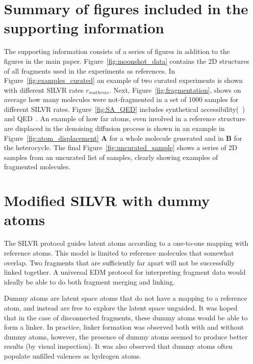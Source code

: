 \documentclass[journal=jacsat,manuscript=article]{achemso}
\begin{document}



\newpage 
\begin{suppinfo}

\section{Summary of figures included in the supporting information}
The supporting information consists of a series of figures in addition to the figures in the main paper. Figure~\ref{fig:moonshot_data} contains the 2D structures of all fragments used in the experiments as references. In Figure~\ref{fig:examples_curated} an example of two curated experiments is shown with different SILVR rates $r_{mathrm{s}}$. Next, Figure~\ref{fig:fragmentation}, shows on average how many molecules were not-fragmented in a set of 1000 samples for different SILVR rates. Figure~\ref{fig:SA_QED} includes synthetical accessibility(~\cite{ertl2009estimation}) and QED~\cite{bickerton2012quantifying, wildman1999prediction}. An example of how far atoms, even involved in a reference structure are displaced in the denoising diffusion process is shown in an example in Figure~\ref{fig:atom_displacement} \textbf{A} for a whole molecule generated and in \textbf{B} for the heterocycle.  The final Figure~\ref{fig:uncurated_sample} shows a series of 2D samples from an uncurated list of samples, clearly showing examples of fragmented molecules.  


\section{Modified SILVR with dummy atoms}
The SILVR protocol guides latent atoms according to a one-to-one mapping with reference atoms. This model is limited to reference molecules that somewhat overlap. Two fragments that are sufficiently far apart will not be successfully linked together. A universal EDM protocol for interpreting fragment data would ideally be able to do both fragment merging and linking.

Dummy atoms are latent space atoms that do not have a mapping to a reference atom, and instead are free to explore the latent space unguided. It was hoped that in the case of disconnected fragments, these dummy atoms would be able to form a linker. In practice, linker formation was observed both with and without dummy atoms, however, the presence of dummy atoms seemed to produce better results (by visual inspection). It was also observed that dummy atoms often populate unfilled valences as hydrogen atoms. 


\end{suppinfo}
\end{document}
